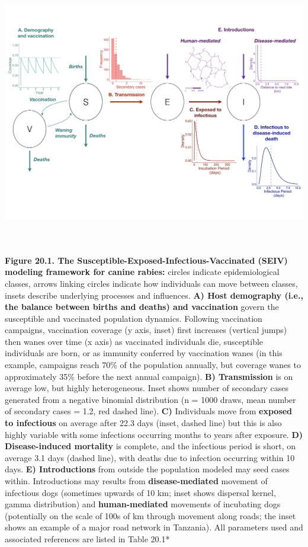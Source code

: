 \documentclass[
]{book}
\begin{document}
\includegraphics[width=6.42531in,height=4.62637in]{figs/ch3/image1.jpeg}

\textbf{Figure 20.1. The Susceptible-Exposed-Infectious-Vaccinated (SEIV)
modeling framework for canine rabies:} circles indicate epidemiological
classes, arrows linking circles indicate how individuals can move
between classes, insets describe underlying processes and influences.
\textbf{A) Host demography (i.e., the balance between births and deaths) and
vaccination} govern the susceptible and vaccinated population dynamics.
Following vaccination campaigns, vaccination coverage (y axis, inset)
first increases (vertical jumps) then wanes over time (x axis) as
vaccinated individuals die, susceptible individuals are born, or as
immunity conferred by vaccination wanes (in this example, campaigns
reach 70\% of the population annually, but coverage wanes to
approximately 35\% before the next annual campaign). \textbf{B) Transmission}
is on average low, but highly heterogeneous. Inset shows number of
secondary cases generated from a negative binomial distribution (n =
1000 draws, mean number of secondary cases = 1.2, red dashed line).
\textbf{C)} Individuals move from \textbf{exposed to infectious} on average after
22.3 days (inset, dashed line) but this is also highly variable with
some infections occurring months to years after exposure. \textbf{D)
Disease-induced mortality} is complete, and the infectious period is
short, on average 3.1 days (dashed line), with deaths due to infection
occurring within 10 days. \textbf{E) Introductions} from outside the
population modeled may seed cases within. Introductions may results from
\textbf{disease-mediated} movement of infectious dogs (sometimes upwards of
10 km; inset shows dispersal kernel, gamma distribution) and
\textbf{human-mediated} movements of incubating dogs (potentially on the
scale of 100s of km through movement along roads; the inset shows an
example of a major road network in Tanzania). All parameters used and
associated references are listed in Table 20.1*
\end{document}
